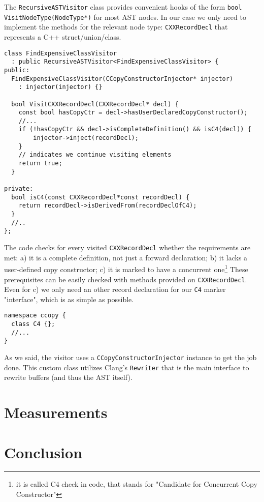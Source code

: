 \documentclass{article}
\begin{document}
The \texttt{RecursiveASTVisitor} class provides convenient hooks of the form \texttt{bool VisitNodeType(NodeType*)} for most AST nodes. In our case we only need to implement the methods for the relevant node type: \texttt{CXXRecordDecl} that represents a C++ struct/union/class.

\begin{verbatim}
class FindExpensiveClassVisitor
  : public RecursiveASTVisitor<FindExpensiveClassVisitor> {
public:
  FindExpensiveClassVisitor(CCopyConstructorInjector* injector)
    : injector(injector) {}

  bool VisitCXXRecordDecl(CXXRecordDecl* decl) {
    const bool hasCopyCtr = decl->hasUserDeclaredCopyConstructor();
    //...
    if (!hasCopyCtr && decl->isCompleteDefinition() && isC4(decl)) {
   	    injector->inject(recordDecl);
    }
    // indicates we continue visiting elements
    return true;
  }

private:
  bool isC4(const CXXRecordDecl*const recordDecl) {
    return recordDecl->isDerivedFrom(recordDeclOfC4);
  }
  //..
};
\end{verbatim}

The code checks for every visited \texttt{CXXRecordDecl} whether the requirements are met: a) it is a complete definition, not just a forward declaration; b) it lacks a user-defined copy constructor; c) it is marked to have a concurrent one\footnote{it is called C4 check in code, that stands for "Candidate for Concurrent Copy Constructor"}
These prerequisites can be easily checked with methods provided on \texttt{CXXRecordDecl}. Even for c) we only need an other record declaration for our \texttt{C4} marker "interface", which is as simple as possible.

\begin{verbatim}
namespace ccopy {
  class C4 {};
  //...
}
\end{verbatim}

As we said, the visitor uses a \texttt{CCopyConstructorInjector} instance to get the job done. This custom class utilizes Clang's \texttt{Rewriter} that is the main interface to rewrite buffers (and thus the AST itself).
\section{Measurements}
\label{measurements}

\section{Conclusion}
\label{conc}
\end{document}
